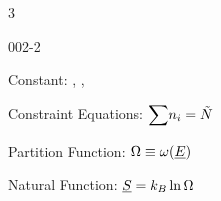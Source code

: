 3\begin{mitframe}{002-2} %

    
	\begin{listone}
    
    	\item Constant: \nummoles, \uline{\vol}, \uline{\energy}
    
    	\item Constraint Equations: $\mathlarger\sum\nolimits \molspecies{i} = \totmoles$ 
    
           
    	\item Partition Function: $\mpc \equiv \mpf(\uline{\energy})$
    
           
    	\item Natural Function: $\uline{\entropy} = \boltz\ln\mpc$
    
    
    
	\end{listone}			

\end{mitframe}